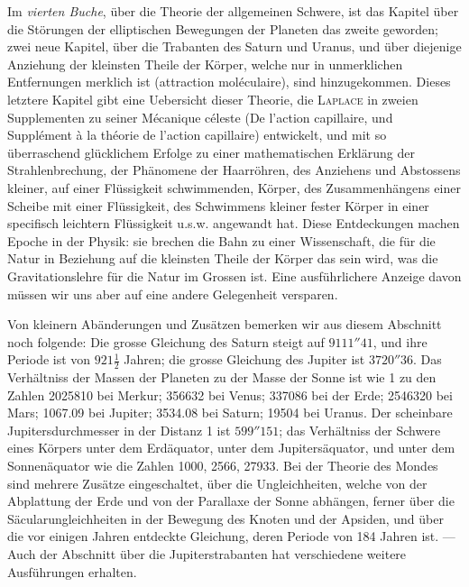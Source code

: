 Im \emph{vierten Buche}, über die Theorie der allgemeinen Schwere, ist das Kapitel über die Störungen der elliptischen Bewegungen der Planeten das zweite geworden; zwei neue Kapitel, über die Trabanten des Saturn und Uranus, und über diejenige Anziehung der kleinsten Theile der Körper, welche nur in unmerklichen Entfernungen merklich ist (attraction moléculaire), sind hinzugekommen. Dieses letztere Kapitel gibt eine Uebersicht dieser Theorie, die \textsc{Laplace} in zweien Supplementen zu seiner Mécanique céleste (De l'action capillaire, und Supplément à la théorie de l'action capillaire) entwickelt, und mit so überraschend glücklichem Erfolge zu einer mathematischen Erklärung der Strahlenbrechung, der Phänomene der Haarröhren, des Anziehens und Abstossens kleiner, auf einer Flüssigkeit schwimmenden, Körper, des Zusammenhängens einer Scheibe mit einer Flüssigkeit, des Schwimmens kleiner fester Körper in einer specifisch leichtern Flüssigkeit u.s.w. angewandt hat. Diese Entdeckungen machen Epoche in der Physik: sie brechen die Bahn zu einer Wissenschaft, die für die Natur in Beziehung auf die kleinsten Theile der Körper das sein wird, was die Gravitationslehre für die Natur im Grossen ist. Eine ausführlichere Anzeige davon müssen wir uns aber auf eine andere Gelegenheit versparen.

Von kleinern Abänderungen und Zusätzen bemerken wir aus diesem Abschnitt noch folgende: Die grosse Gleichung des Saturn steigt auf $9111''41$, und ihre Periode ist von $921\frac{1}{2}$ Jahren; die grosse Gleichung des Jupiter ist $3720''36$. Das Verhältniss der Massen der Planeten zu der Masse der Sonne ist wie 1 zu den Zahlen 2025810 bei Merkur; 356632 bei Venus; 337086 bei der Erde; 2546320 bei Mars; 1067.09 bei Jupiter; 3534.08 bei Saturn; 19504 bei Uranus. Der scheinbare Jupitersdurchmesser in der Distanz 1 ist $599''151$; das Verhältniss der Schwere eines Körpers unter dem Erdäquator, unter dem Jupitersäquator, und unter dem Sonnenäquator wie die Zahlen 1000, 2566, 27933. Bei der Theorie des Mondes sind mehrere Zusätze eingeschaltet, über die Ungleichheiten, welche von der Abplattung der Erde und von der Parallaxe der Sonne abhängen, ferner über die Säcularungleichheiten in der Bewegung des Knoten und der Apsiden, und über die vor einigen Jahren entdeckte Gleichung, deren Periode von 184 Jahren ist. --- Auch der Abschnitt über die Jupiterstrabanten hat verschiedene weitere Ausführungen erhalten.

